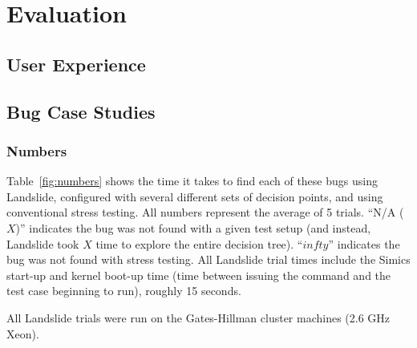 \section{Evaluation}

\subsection{User Experience}


\subsection{Bug Case Studies}
\label{sec:eval-casestudy}


\subsubsection{Numbers}

Table~\ref{fig:numbers} shows the time it takes to find each of these bugs using Landslide, configured with several different sets of decision points, and using conventional stress testing.
All numbers represent the average of 5 trials. ``N/A ($X$)'' indicates the bug was not found with a given test setup (and instead, Landslide took $X$ time to explore the entire decision tree). ``$infty$'' indicates the bug was not found with stress testing. %
All Landslide trial times include the Simics start-up and kernel boot-up time (time between issuing the command and the test case beginning to run), roughly 15 seconds.

All Landslide trials were run on the Gates-Hillman cluster machines (2.6 GHz Xeon).

